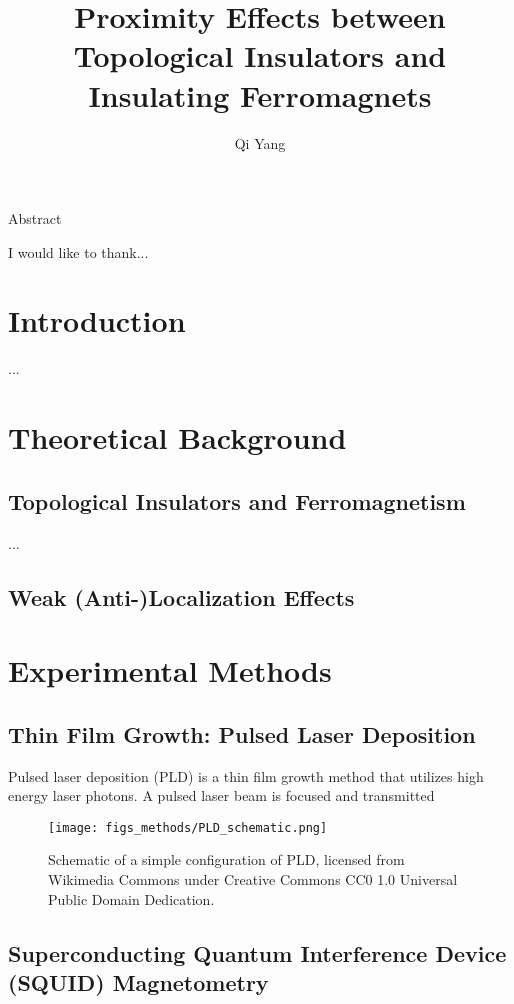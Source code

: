 \documentclass{report}
\begin{document}
\title{Proximity Effects between Topological Insulators and Insulating Ferromagnets}
\author{Qi Yang}

\beforepreface


    Abstract 


    I would like to thank...
\afterpreface

\captionsetup{width=0.95\columnwidth}%
\chapter{Introduction}
    ...

\chapter{Theoretical Background}
    \section{Topological Insulators and Ferromagnetism}\label{sec:TI-FM}
...
    \section{Weak (Anti-)Localization Effects}\label{sec:wl}

	
    
\chapter{Experimental Methods}
    \section{Thin Film Growth: Pulsed Laser Deposition}
Pulsed laser deposition (PLD) is a thin film growth method that utilizes high energy laser photons. A pulsed laser beam is focused and transmitted 
\begin{figure}[ht]%
    \texttt{[image: figs\_methods/PLD\_schematic.png]}%
    \caption[A simple schematic of PLD]{\label{fig:PLD_schematic}Schematic of a simple configuration of PLD, licensed from Wikimedia Commons under Creative Commons CC0 1.0 Universal Public Domain Dedication.}%
\end{figure}%
 
    
    \section{Superconducting Quantum Interference Device (SQUID) Magnetometry}
\end{document}
